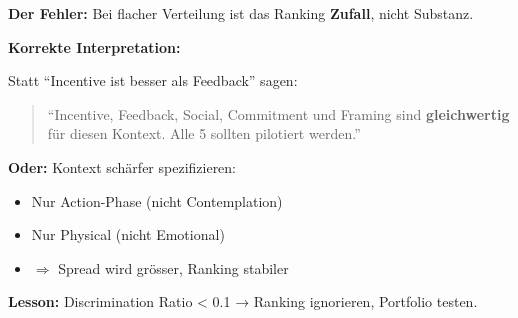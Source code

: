 \begin{tcolorbox}[colback=red!3!white, colframe=red!60!black,
    title=\textbf{Case Study 3: Die Krankenkasse und das Ranking-Roulette}]
\textbf{Der Fehler:} Bei flacher Verteilung ist das Ranking \textbf{Zufall}, nicht Substanz.

\medskip
\textbf{Korrekte Interpretation:}

Statt ``Incentive ist besser als Feedback'' sagen:
\begin{quote}
``Incentive, Feedback, Social, Commitment und Framing sind \textbf{gleichwertig} für diesen Kontext. Alle 5 sollten pilotiert werden.''
\end{quote}

\textbf{Oder:} Kontext schärfer spezifizieren:
\begin{itemize}[nosep]
    \item Nur Action-Phase (nicht Contemplation)
    \item Nur Physical (nicht Emotional)
    \item $\Rightarrow$ Spread wird grösser, Ranking stabiler
\end{itemize}

\textbf{Lesson:} \colorbox{yellow!30}{Discrimination Ratio < 0.1 → Ranking ignorieren, Portfolio testen.}

\end{tcolorbox}

